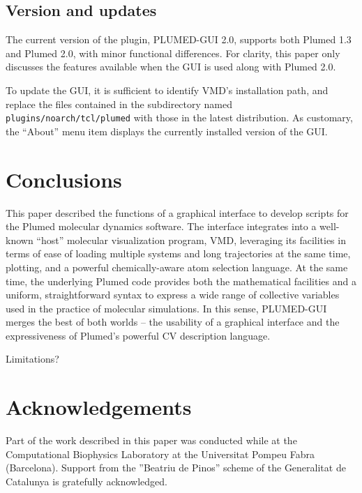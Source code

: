\documentclass[preprint,12pt]{elsarticle}
\begin{document}
\subsection{Version and updates}

The current version of the plugin, PLUMED-GUI 2.0, supports both
Plumed 1.3 and Plumed 2.0, with minor functional differences. For
clarity, this paper only discusses the features available when the GUI
is used along with Plumed 2.0.

To update the GUI, it is sufficient to identify VMD's installation
path, and replace the files contained in the subdirectory named
\verb+plugins/noarch/tcl/plumed+ with those in the latest
distribution.  As customary, the ``About'' menu item displays the
currently installed version of the GUI.




\section{Conclusions}

This paper described the functions of a graphical interface to develop
scripts for the Plumed molecular dynamics software. The interface
integrates into a well-known ``host'' molecular visualization program,
VMD\cite{Humphrey_Dalke_Schulten_1996}, leveraging its facilities in terms of ease of loading multiple
systems and long trajectories at the same time, plotting, and a
powerful chemically-aware atom selection language. At the same time,
the underlying Plumed code provides both the mathematical facilities
and a uniform, straightforward syntax to express a wide range of
collective variables used in the practice of molecular simulations.
In this sense, PLUMED-GUI merges the best of both worlds -- the
usability of a graphical interface and the expressiveness of Plumed's
powerful CV description language.

Limitations?



\section{Acknowledgements}

Part of the work described in this paper was conducted while at the
Computational Biophysics Laboratory at the Universitat Pompeu Fabra
(Barcelona). Support from the ''Beatriu de Pinos'' scheme of the
Generalitat de Catalunya is gratefully acknowledged.







\end{document}
